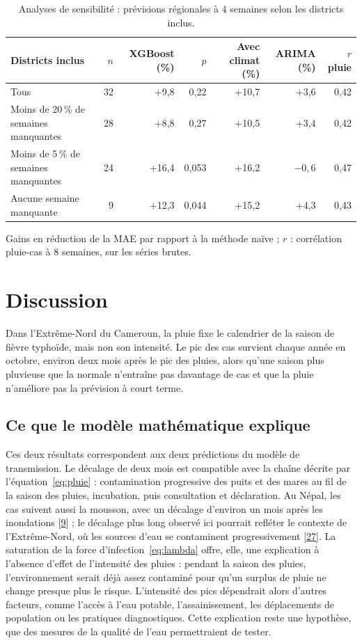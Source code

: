 \documentclass[11pt]{article}
\begin{document}
\begin{table}[!htbp]\centering\small
\caption{Analyses de sensibilité : prévisions régionales à 4 semaines selon les districts inclus.}\label{tab:sens}
\begin{tabularx}{\linewidth}{@{}L r r r r r r@{}}\toprule
Districts inclus & $n$ & XGBoost (\%) & $p$ & Avec climat (\%) & ARIMA (\%) & $r$ pluie \\\midrule
Tous & 32 & +9,8 & 0,22 & +10,7 & +3,6 & 0,42 \\
Moins de 20\,\% de semaines manquantes & 28 & +8,8 & 0,27 & +10,5 & +3,4 & 0,42 \\
Moins de 5\,\% de semaines manquantes & 24 & +16,4 & 0,053 & +16,2 & $-0{,}6$ & 0,47 \\
Aucune semaine manquante & 9 & +12,3 & 0,044 & +15,2 & +4,3 & 0,43 \\\bottomrule
\end{tabularx}
\par\smallskip\footnotesize\raggedright Gains en réduction de la MAE par rapport à la méthode naïve ; $r$ : corrélation pluie-cas à 8 semaines, sur les séries brutes.
\end{table}

\section{Discussion}
Dans l'Extrême-Nord du Cameroun, la pluie fixe le calendrier de la saison de fièvre typhoïde, mais non son intensité. Le pic des cas survient chaque année en octobre, environ deux mois après le pic des pluies, alors qu'une saison plus pluvieuse que la normale n'entraîne pas davantage de cas et que la pluie n'améliore pas la prévision à court terme.

\subsection{Ce que le modèle mathématique explique}
Ces deux résultats correspondent aux deux prédictions du modèle de transmission. Le décalage de deux mois est compatible avec la chaîne décrite par l'équation~\eqref{eq:pluie} : contamination progressive des puits et des mares au fil de la saison des pluies, incubation, puis consultation et déclaration. Au Népal, les cas suivent aussi la mousson, avec un décalage d'environ un mois après les inondations [\hyperlink{ref9}{9}] ; le décalage plus long observé ici pourrait refléter le contexte de l'Extrême-Nord, où les sources d'eau se contaminent progressivement [\hyperlink{ref27}{27}]. La saturation de la force d'infection~\eqref{eq:lambda} offre, elle, une explication à l'absence d'effet de l'intensité des pluies : pendant la saison des pluies, l'environnement serait déjà assez contaminé pour qu'un surplus de pluie ne change presque plus le risque. L'intensité des pics dépendrait alors d'autres facteurs, comme l'accès à l'eau potable, l'assainissement, les déplacements de population ou les pratiques diagnostiques. Cette explication reste une hypothèse, que des mesures de la qualité de l'eau permettraient de tester.
\end{document}
